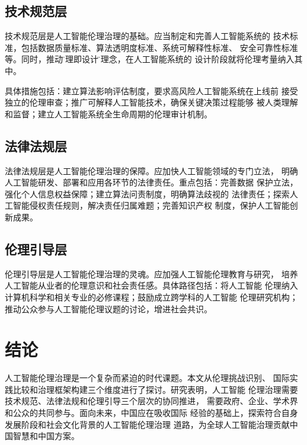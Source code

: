 \documentclass{xmu_course}
\begin{document}
\subsection{技术规范层}

技术规范层是人工智能伦理治理的基础。应当制定和完善人工智能系统的
技术标准，包括数据质量标准、算法透明度标准、系统可解释性标准、
安全可靠性标准等。同时，推动\"伦理即设计\"的理念，在人工智能系统的
设计阶段就将伦理考量纳入其中\cite{floridi2019}。

具体措施包括：建立算法影响评估制度，要求高风险人工智能系统在上线前
接受独立的伦理审查；推广可解释人工智能技术，确保关键决策过程能够
被人类理解和监督；建立人工智能系统全生命周期的伦理审计机制。

\subsection{法律法规层}

法律法规层是人工智能伦理治理的保障。应加快人工智能领域的专门立法，
明确人工智能研发、部署和应用各环节的法律责任。重点包括：完善数据
保护立法，强化个人信息权益保障；建立算法问责制度，明确算法歧视的
法律责任；探索人工智能侵权责任规则，解决责任归属难题；完善知识产权
制度，保护人工智能创新成果。

\subsection{伦理引导层}

伦理引导层是人工智能伦理治理的灵魂。应加强人工智能伦理教育与研究，
培养人工智能从业者的伦理意识和社会责任感。具体路径包括：将人工智能
伦理纳入计算机科学和相关专业的必修课程；鼓励成立跨学科的人工智能
伦理研究机构；推动公众参与人工智能伦理议题的讨论，增进社会共识。

\section{结论}

人工智能伦理治理是一个复杂而紧迫的时代课题。本文从伦理挑战识别、
国际实践比较和治理框架构建三个维度进行了探讨。研究表明，人工智能
伦理治理需要技术规范、法律法规和伦理引导三个层次的协同推进，
需要政府、企业、学术界和公众的共同参与。面向未来，中国应在吸收国际
经验的基础上，探索符合自身发展阶段和社会文化背景的人工智能伦理治理
道路，为全球人工智能治理贡献中国智慧和中国方案。
\end{document}
